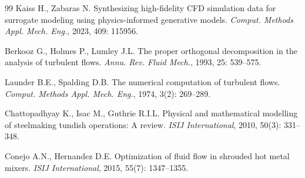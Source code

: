 \documentclass[12pt,a4paper]{article}
\begin{document}
\begin{thebibliography}{99}
 Kaiss H., Zabaras N. Synthesizing high-fidelity CFD simulation data for surrogate modeling using physics-informed generative models. \textit{Comput. Methods Appl. Mech. Eng.}, 2023, 409: 115956.

 Berkooz G., Holmes P., Lumley J.L. The proper orthogonal decomposition in the analysis of turbulent flows. \textit{Annu. Rev. Fluid Mech.}, 1993, 25: 539--575.

 Launder B.E., Spalding D.B. The numerical computation of turbulent flows. \textit{Comput. Methods Appl. Mech. Eng.}, 1974, 3(2): 269--289.

 Chattopadhyay K., Isac M., Guthrie R.I.L. Physical and mathematical modelling of steelmaking tundish operations: A review. \textit{ISIJ International}, 2010, 50(3): 331--348.

 Conejo A.N., Hernandez D.E. Optimization of fluid flow in shrouded hot metal mixers. \textit{ISIJ International}, 2015, 55(7): 1347--1355.

\end{thebibliography}
\end{document}
